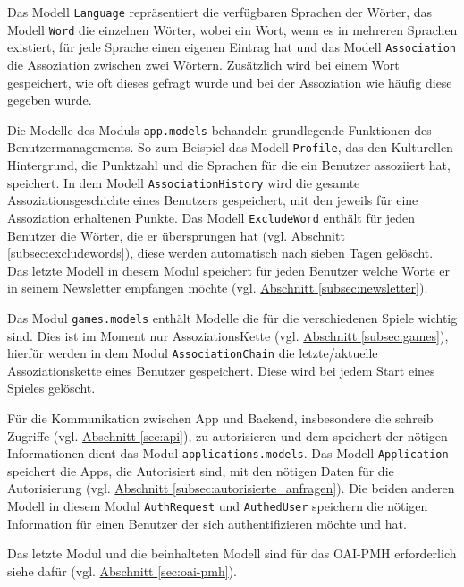 Das Modell \texttt{Language} repräsentiert die verfügbaren Sprachen der Wörter, das Modell \texttt{Word} die einzelnen Wörter, wobei ein Wort, wenn es in mehreren Sprachen existiert, für jede Sprache einen eigenen Eintrag hat und das Modell \texttt{Association} die Assoziation zwischen zwei Wörtern. Zusätzlich wird bei einem Wort gespeichert, wie oft dieses gefragt wurde und bei der Assoziation wie häufig diese gegeben wurde.

Die Modelle des Moduls \texttt{app.models} behandeln grundlegende Funktionen des Benutzermanagements. So zum Beispiel das Modell \texttt{Profile}, das den Kulturellen Hintergrund, die Punktzahl und die Sprachen für die ein Benutzer assoziiert hat, speichert. In dem Modell \texttt{AssociationHistory} wird die gesamte Assoziationsgeschichte eines Benutzers gespeichert, mit den jeweils für eine Assoziation erhaltenen Punkte. Das Modell \texttt{ExcludeWord} enthält für jeden Benutzer die Wörter, die er übersprungen hat (vgl. \hyperref[subsec:excludewords]{Abschnitt \ref*{subsec:excludewords}}), diese werden automatisch nach sieben Tagen gelöscht. Das letzte Modell in diesem Modul speichert für jeden Benutzer welche Worte er in seinem Newsletter empfangen möchte (vgl. \hyperref[subsec:newsletter]{Abschnitt \ref*{subsec:newsletter}}).

Das Modul \texttt{games.models} enthält Modelle die für die verschiedenen Spiele wichtig sind. Dies ist im Moment nur AssoziationsKette (vgl. \hyperref[subsec:games]{Abschnitt \ref*{subsec:games}}), hierfür werden in dem Modul \texttt{AssociationChain} die letzte/aktuelle Assoziationskette eines Benutzer gespeichert. Diese wird bei jedem Start eines Spieles gelöscht.

Für die Kommunikation zwischen App und Backend, insbesondere die schreib Zugriffe (vgl. \hyperref[sec:api]{Abschnitt \ref*{sec:api}}), zu autorisieren und dem speichert der nötigen Informationen dient das Modul \texttt{applications.models}. Das Modell \texttt{Application} speichert die Apps, die Autorisiert sind, mit den nötigen Daten für die Autorisierung (vgl. \hyperref[subsec:autorisierte_anfragen]{Abschnitt \ref*{subsec:autorisierte_anfragen}}). Die beiden anderen Modell in diesem Modul \texttt{AuthRequest} und \texttt{AuthedUser} speichern die nötigen Information für einen Benutzer der sich authentifizieren möchte und hat.

Das letzte Modul und die beinhalteten Modell sind für das OAI-PMH erforderlich siehe dafür (vgl. \hyperref[sec:oai-pmh]{Abschnitt \ref*{sec:oai-pmh}}).

